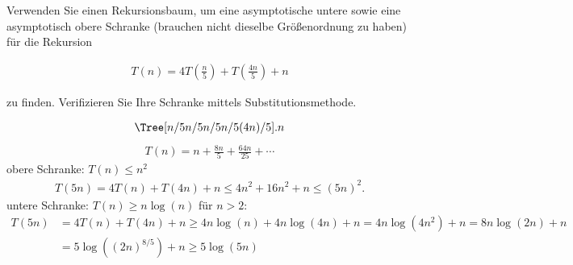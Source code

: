 
\begin{exercise}

Verwenden Sie einen Rekursionsbaum, um eine asymptotische untere sowie eine asymptotisch obere Schranke (brauchen nicht dieselbe Größenordnung zu haben) für die Rekursion

\begin{align*}
  T(n) = 4T\left(\frac{n}{5}\right) + T\left(\frac{4n}{5}\right) + n
\end{align*}

zu finden. Verifizieren Sie Ihre Schranke mittels Substitutionsmethode.

\end{exercise}


\begin{solution}

\begin{align*}
  \Tree [n/5 n/5 n/5 n/5 (4n)/5 ].n
\end{align*}
\begin{align*}
  T(n) = n + \frac{8n}{5} + \frac{64n}{25} + \cdots
\end{align*}
obere Schranke: $T(n) \leq n^2$
\begin{align*}
  T(5n) = 4T(n) + T(4n) + n \leq 4n^2 + 16n^2 + n \leq
  (5n)^2.
\end{align*}
untere Schranke: $T(n) \geq n\log(n)$ für $n > 2$:
\begin{align*}
  T(5n) &= 4T(n) + T(4n) + n \geq 4n\log(n) + 4n\log(4n) + n = 4n\log(4n^2) + n
  = 8n\log(2n) + n \\
   &= 5\log((2n)^{8/5}) + n \geq 5\log(5n)
\end{align*}
\end{solution}


